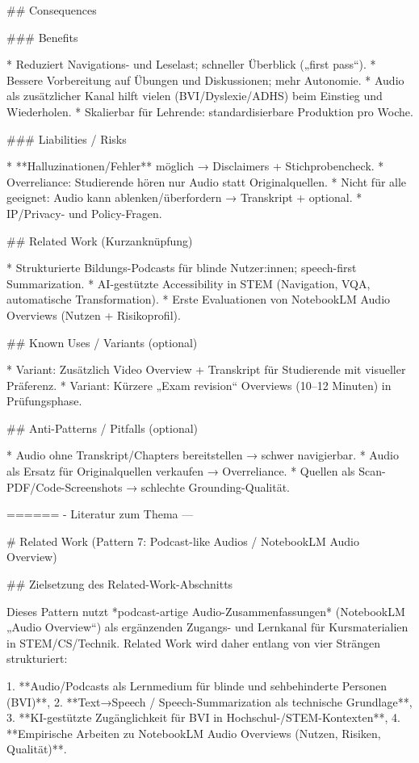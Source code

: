 ## Consequences

### Benefits

* Reduziert Navigations- und Leselast; schneller Überblick („first pass“).
* Bessere Vorbereitung auf Übungen und Diskussionen; mehr Autonomie.
* Audio als zusätzlicher Kanal hilft vielen (BVI/Dyslexie/ADHS) beim Einstieg und Wiederholen.
* Skalierbar für Lehrende: standardisierbare Produktion pro Woche.

### Liabilities / Risks

* **Halluzinationen/Fehler** möglich → Disclaimers + Stichprobencheck.
* Overreliance: Studierende hören nur Audio statt Originalquellen.
* Nicht für alle geeignet: Audio kann ablenken/überfordern → Transkript + optional.
* IP/Privacy- und Policy-Fragen.

## Related Work (Kurzanknüpfung)

* Strukturierte Bildungs-Podcasts für blinde Nutzer:innen; speech-first Summarization.
* AI-gestützte Accessibility in STEM (Navigation, VQA, automatische Transformation).
* Erste Evaluationen von NotebookLM Audio Overviews (Nutzen + Risikoprofil).

## Known Uses / Variants (optional)

* Variant: Zusätzlich Video Overview + Transkript für Studierende mit visueller Präferenz.
* Variant: Kürzere „Exam revision“ Overviews (10–12 Minuten) in Prüfungsphase.

## Anti-Patterns / Pitfalls (optional)

* Audio ohne Transkript/Chapters bereitstellen → schwer navigierbar.
* Audio als Ersatz für Originalquellen verkaufen → Overreliance.
* Quellen als Scan-PDF/Code-Screenshots → schlechte Grounding-Qualität.



====== - Literatur zum Thema ---

# Related Work (Pattern 7: Podcast-like Audios / NotebookLM Audio Overview)

## Zielsetzung des Related-Work-Abschnitts

Dieses Pattern nutzt *podcast-artige Audio-Zusammenfassungen* (NotebookLM „Audio Overview“) als ergänzenden Zugangs- und Lernkanal für Kursmaterialien in STEM/CS/Technik. Related Work wird daher entlang von vier Strängen strukturiert:

1. **Audio/Podcasts als Lernmedium für blinde und sehbehinderte Personen (BVI)**,
2. **Text→Speech / Speech-Summarization als technische Grundlage**,
3. **KI-gestützte Zugänglichkeit für BVI in Hochschul-/STEM-Kontexten**,
4. **Empirische Arbeiten zu NotebookLM Audio Overviews (Nutzen, Risiken, Qualität)**.


